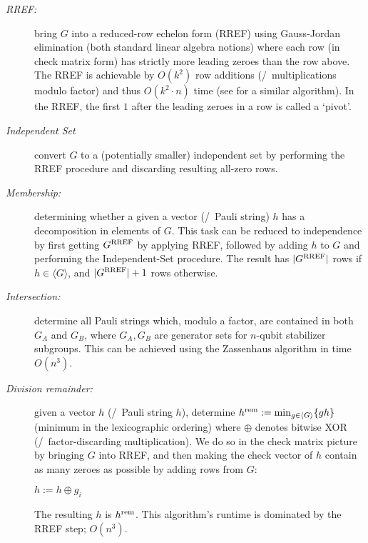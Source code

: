 \begin{description}
    \item[\emph{RREF:}] bring $G$ into a reduced-row echelon form (RREF) using Gauss-Jordan elimination (both standard linear algebra notions) where each row (in check matrix form) has strictly more leading zeroes than the row above.
        The RREF is achievable by $O(k^2)$ row additions (/~multiplications modulo factor) and thus $O(k^2 \cdot n)$ time (see \cite{berg2020circuit} for a similar algorithm).
        In the RREF, the first $1$ after the leading zeroes in a row is called a `pivot'.
    \item[\emph{Independent Set}] convert $G$ to a (potentially smaller) independent set by performing the RREF procedure and discarding resulting all-zero rows.
    \item[\emph{Membership:}] determining whether a given a vector (/~Pauli string) $h$ has a decomposition in elements of $G$.
        This task can be reduced to independence by first getting $G^{\textnormal{RREF}}$ by applying RREF, followed by adding $h$ to $G$ and performing the Independent-Set procedure. The result has $|G^{\textnormal{RREF}}|$ rows if $h\in \langle G\rangle$, and $|G^{\textnormal{RREF}}| + 1$ rows otherwise.
    \item[\emph{Intersection:}] determine all Pauli strings which, modulo a factor, are contained in both $G_A$ and $G_B$, where $G_A, G_B$ are generator sets for $n$-qubit stabilizer subgroups.
        This can be achieved using the Zassenhaus algorithm \cite{LUKS1997335} in time $O(n^3)$.
    \item[\emph{Division remainder:}] given a vector $h$  (/~Pauli string $h$), determine \mbox{$ h^{\textnormal{rem}} := \min_{g\in \langle G\rangle} \{ g  h\}$} (minimum in the lexicographic ordering) where $\oplus$ denotes bitwise XOR (/~factor-discarding multiplication).
        We do so in the check matrix picture by bringing $G$ into RREF, and then making the check vector of $h$ contain as many zeroes as possible by adding rows from $G$:
	\begin{algorithmic}[1]
		$h := h \oplus g_i$
        \EndIf
        \EndFor
	\end{algorithmic}
        The resulting  $h$ is $h^{\textnormal{rem}}$.
This algorithm's runtime is dominated by the RREF step; $O(n^3)$.
\end{description}

